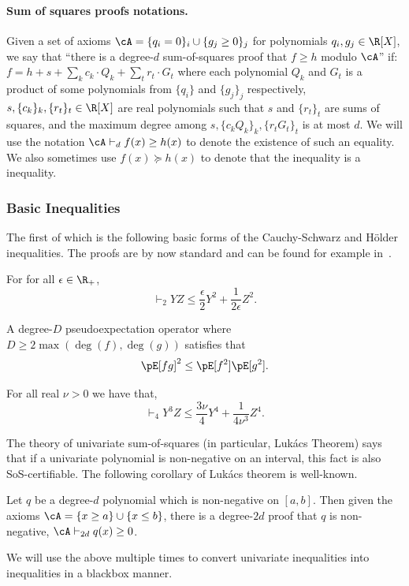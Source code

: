 \paragraph{Sum of squares proofs notations.}
Given a set of axioms $\cA = \{q_i = 0\}_i \cup \{g_j \ge 0\}_j$ for polynomials $q_i, g_j \in \R[X]$, we say that ``there is a degree-$d$ sum-of-squares proof that $f \ge h$ modulo $\cA$'' if: $f = h + s + \sum_k c_k\cdot Q_k + \sum_t r_t \cdot G_t$ where each polynomial $Q_k$ and $G_t$ is a product of some polynomials from $\{q_i\}$ and $\{g_j\}_j$ respectively, $s,\{c_k\}_k,\{r_t\}_t \in \R[X]$ are real polynomials such that $s$ and $\{r_t\}_t$ are sums of squares, and the maximum degree among $s,\{c_k Q_k\}_k, \{r_t G_t\}_t$ is at most $d$. We will use the notation $\cA \vdash_d f(x) \ge h(x)$ to denote the existence of such an equality.
We also sometimes use $f(x) \succeq h(x)$ to denote that the inequality is a \sos inequality.


\subsubsection{Basic Inequalities}
The first of which is the following basic forms of the Cauchy-Schwarz and H\"{o}lder inequalities. 
The proofs are by now standard and can be found for example in~\cite{BarakKS14,ODonnellZ13}.
\begin{lemma}\label{CS1-prelim}
For for all $\epsilon \in \R_+$, 
$$
\vdash_2 YZ \leq \frac{\epsilon}{2}Y^2 + \frac{1}{2\epsilon}Z^2.
$$
\end{lemma}

\begin{lemma}\label{CS2-prelim}
A degree-$D$ pseudoexpectation operator where 
$D \geq  2\max(\deg(f),\deg(g))$ satisfies that
$$\pE[fg]^2 \leq \pE[f^2]\pE[g^2].$$
\end{lemma}


\begin{fact}\label{fact:sos-hol}
For all real $\nu > 0$ we have that,
$$\vdash_4 Y^3 Z \leq \frac{3\nu}{4} Y^4 + \frac{1}{4\nu^3}Z^4.$$ 
\end{fact}



The theory of univariate sum-of-squares (in particular, Luk\'{a}cs Theorem) says that if a univariate polynomial is non-negative on an interval, this fact is also SoS-certifiable. The following  corollary of Luk\'{a}cs theorem is well-known.
\begin{corollary}\label{cor:Lukacs}
Let $q$ be a degree-$d$ polynomial which is non-negative on $[a,b]$.
Then given the axioms $\cA = \{x \ge a\} \cup\{x \le b\}$, there is a degree-$2d$ \sos proof that $q$ is non-negative, $\cA \vdash_{2d} q(x) \ge 0$.
\end{corollary}
We will use the above multiple times to convert univariate inequalities into \sos inequalities in a blackbox manner.


